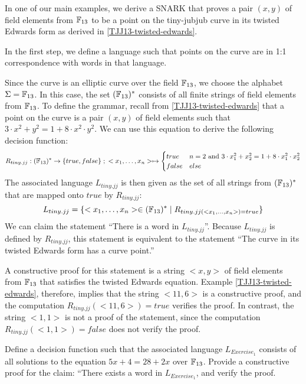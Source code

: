 \begin{example}\label{ex:tiny-jubjub} In one of our main examples, we derive a SNARK that proves a pair $(x,y)$ of field elements from $\mathbb{F}_{13}$ to be a point on the tiny-{jubjub} curve in its twisted Edwards form as derived in \examplename{} \ref{TJJ13-twisted-edwards}.

In the first step, we define a language such that points on the  curve are in 1:1 correspondence with words in that language.

Since the  curve is an elliptic curve over the field $\mathbb{F}_{13}$, we choose the alphabet $\Sigma = \mathbb{F}_{13}$. In this case, the set $(\mathbb{F}_{13})^*$ consists of all finite strings of field elements from $\mathbb{F}_{13}$. To define the grammar, recall from \eqref{TJJ13-twisted-edwards} that a point on the  curve is a pair $(x,y)$ of field elements such that $3\cdot x^2 + y^2 = 1+ 8\cdot x^2\cdot y^2$. We can use this equation to derive the following decision function:
$$
R_{tiny.jj} : (\mathbb{F}_{13})^* \to \{true, false\}\;;\;
<x_1,\ldots,x_n> \mapsto
\begin{cases}
true & n=2 \text{ and } 3\cdot x_1^2 + x_2^2 = 1+ 8\cdot x_1^2\cdot x_2^2\\
false & else
\end{cases}
$$
The associated language $L_{tiny.jj}$ is then given as the set of all strings from $(\mathbb{F}_{13})^*$ that are mapped onto $true$ by $R_{tiny.jj}$:
$$
L_{tiny.jj} = \{<x_1,\ldots,x_n>\in (\mathbb{F}_{13})^*\;|\; R_{tiny.jj(<x_1,\ldots,x_n>)=true}\}
$$
We can claim the statement ``There is a word in $L_{tiny.jj}$''. Because $L_{tiny.jj}$ is defined by $R_{tiny.jj}$, this statement is equivalent to the statement ``The  curve in its twisted Edwards form has a curve point.'' 

A constructive proof for this statement is a string $<x,y>$ of field elements from $\mathbb{F}_{13}$ that satisfies the twisted Edwards equation. Example \eqref{TJJ13-twisted-edwards}, therefore, implies that the string $<11,6>$ is a constructive proof, and the computation $R_{tiny.jj}(<11,6>)=true$ verifies the proof. In contrast, the string $<1,1>$ is not a proof of the statement, since the computation $R_{tiny.jj}(<1,1>)=false$ does not verify the proof.
\end{example}
\begin{exercise}
\label{ex:decision_function_1} Define a decision function such that the associated language $L_{Exercise_1}$ consists of all solutions to the equation $5x + 4 = 28 + 2x$ over $\mathbb{F}_{13}$. Provide a constructive proof for the claim: ``There exists a word in $L_{Exercise_1}$, and verify the proof.  
\end{exercise}
